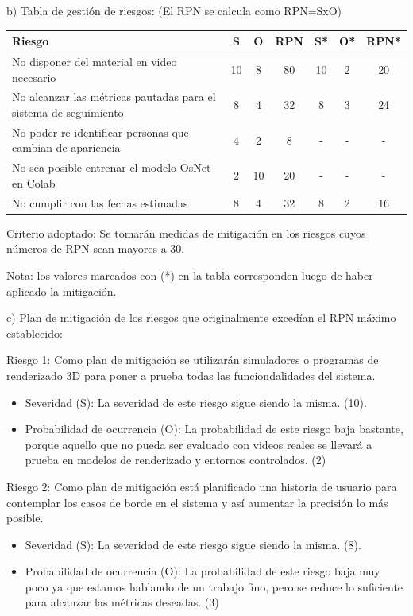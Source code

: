 \documentclass[11pt]{charter}
\begin{document}
b) Tabla de gestión de riesgos:      (El RPN se calcula como RPN=SxO)

\begin{table}[htpb]
\centering
\begin{tabularx}{\linewidth}{@{}|X|c|c|c|c|c|c|@{}}
\hline
\rowcolor[HTML]{C0C0C0} 
Riesgo & S & O & RPN & S* & O* & RPN* \\ \hline
   No disponer del material en video necesario    & 10  & 8   &  80   &  10  &  2  &  20    \\ \hline
   No alcanzar las métricas pautadas para el sistema de seguimiento    &  8  & 4   &  32   &  8  &   3 &   24   \\ \hline
   No poder re identificar personas que cambian de apariencia    &  4  & 2   &   8  &   - &  -  &  -    \\ \hline
   No sea posible entrenar el modelo OsNet en Colab    &  2  & 10  &  20   &  -  & -   &  -    \\ \hline
   No cumplir con las fechas estimadas    &  8  & 4   &  32   &  8  & 2   &  16    \\ \hline
\end{tabularx}%
\end{table}

Criterio adoptado: 
Se tomarán medidas de mitigación en los riesgos cuyos números de RPN sean mayores a 30.

Nota: los valores marcados con (*) en la tabla corresponden luego de haber aplicado la mitigación.

c) Plan de mitigación de los riesgos que originalmente excedían el RPN máximo establecido:

Riesgo 1: Como plan de mitigación se utilizarán simuladores o programas de renderizado 3D para poner a prueba todas las funciondalidades del sistema.
\begin{itemize}
\item Severidad (S): La severidad de este riesgo sigue siendo la misma. (10).
\item Probabilidad de ocurrencia (O): La probabilidad de este riesgo baja bastante, porque aquello que no pueda ser evaluado con videos reales se llevará a prueba en modelos de renderizado y entornos controlados. (2)
\end{itemize}

Riesgo 2: Como plan de mitigación está planificado una historia de usuario para contemplar los casos de borde en el sistema y así aumentar la precisión lo más posible.
\begin{itemize}
\item Severidad (S): La severidad de este riesgo sigue siendo la misma. (8).
\item Probabilidad de ocurrencia (O): La probabilidad de este riesgo baja muy poco ya que estamos hablando de un trabajo fino, pero se reduce lo suficiente para alcanzar las métricas deseadas. (3)
\end{itemize}
\end{document}
